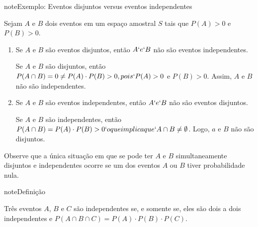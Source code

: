 \begin{sphinxadmonition}{note}{Exemplo: Eventos disjuntos versus eventos independentes}

Sejam \(A\) e \(B\) dois eventos em um espaço amostral \(S\) tais que \(P(A)>0\) e \(P(B)>0\).
\begin{enumerate}
\item {} 
Se \(A\) e \(B\) são eventos disjuntos, então \(A`e `B\) não são eventos independentes.

Se \(A\) e \(B\) são disjuntos, então \(P(A\cap B)=0\neq P(A)\cdot P(B)>0, pois `P(A)>0\) e \(P(B)>0\). Assim, \(A\) e \(B\) não são independentes.

\item {} 
Se \(A\) e \(B\) são eventos independentes, então \(A`e `B\) não são eventos disjuntos.

Se \(A\) e \(B\) são independentes, então \(P(A\cap B)=P(A)\cdot P(B)>0`o que implica que `A\cap B\neq \emptyset\). Logo, \(a\) e \(B\) não são disjuntos.

\end{enumerate}

Observe que a única situação em que se pode ter \(A\)  e \(B\)  simultaneamente disjuntos e independentes ocorre se um dos eventos \(A\) ou \(B\) tiver probabilidade nula.
\end{sphinxadmonition}

\begin{sphinxadmonition}{note}{Definição}

Três eventos \(A\), \(B\)  e  \(C\) são independentes se, e somente se, eles são dois a dois independentes e \(P(A\cap B\cap C)=P(A)\cdot P(B)\cdot P(C)\).
\end{sphinxadmonition}

